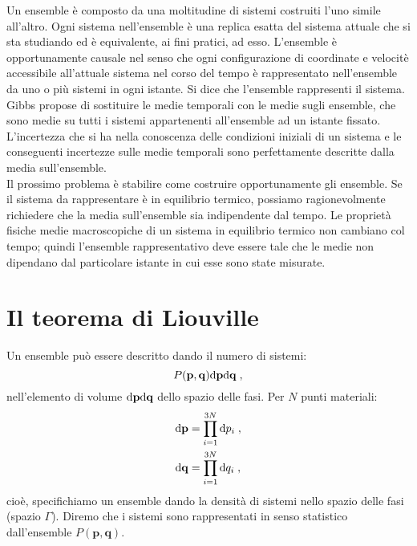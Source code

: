 Un ensemble è composto da una moltitudine di sistemi costruiti l'uno simile all'altro. Ogni sistema nell'ensemble è una replica esatta 
del sistema attuale che si sta studiando ed è equivalente, ai fini pratici, ad esso. L'ensemble è opportunamente causale nel senso che 
ogni configurazione di coordinate e velocitè accessibile all'attuale sistema nel corso del tempo è rappresentato nell'ensemble da uno o 
più sistemi in ogni istante. Si dice che l'ensemble rappresenti il sistema. Gibbs propose di sostituire le medie temporali con le medie 
sugli ensemble, che sono medie su tutti i sistemi appartenenti all'ensemble ad un istante fissato. L'incertezza che si ha nella 
conoscenza delle condizioni iniziali di un sistema e le conseguenti incertezze sulle medie temporali sono perfettamente descritte dalla 
media sull'ensemble. \\
Il prossimo problema è stabilire come costruire opportunamente gli ensemble. Se il sistema da rappresentare è in equilibrio termico, 
possiamo ragionevolmente richiedere che la media sull'ensemble sia indipendente dal tempo. Le proprietà fisiche medie macroscopiche di 
un sistema in equilibrio termico non cambiano col tempo; quindi l'ensemble rappresentativo deve essere tale che le medie non dipendano 
dal particolare istante in cui esse sono state misurate.
\pagebreak
\section{Il teorema di Liouville}
Un ensemble può essere descritto dando il numero di sistemi:
\begin{equation}
P(\mathbf{p},\mathbf{q})\mathrm{d}{\mathbf{p}}\mathrm{d}{\mathbf{q}}\;,
\end{equation}
nell'elemento di volume $\mathrm{d}{\mathbf{p}}\mathrm{d}{\mathbf{q}}$ dello spazio delle fasi. Per $N$ punti materiali:
\begin{align}
\mathrm{d}{\mathbf{p}}&=\prod_{i=1}^{3N}\mathrm{d}{p_i}\;,\notag \\
\mathrm{d}{\mathbf{q}} &=\prod_{i=1}^{3N}\mathrm{d}{q_i}\;,
\end{align}
cioè, specifichiamo un ensemble dando la densità di sistemi nello spazio delle fasi (spazio $\Gamma$). Diremo che i sistemi 
sono rappresentati in senso statistico dall'ensemble $P(\mathbf{p},\mathbf{q})$. \\

